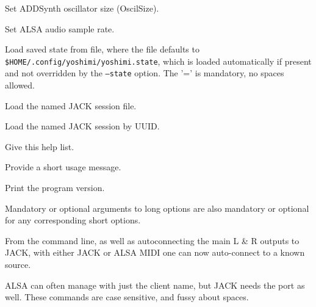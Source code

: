       Set ADDSynth oscillator size (OscilSize).

      Set ALSA audio sample rate.

      Load saved state from file, where the file defaults to
      \texttt{\$HOME/.config/yoshimi/yoshimi.state}, which is loaded
      automatically if present and not overridden by the \texttt{--state}
      option. The '=' is mandatory, no spaces allowed.

      Load the named JACK session file.

      Load the named JACK session by UUID.

      Give this help list.

      Provide a short usage message.

      Print the program version.

   Mandatory or optional arguments to long options are also mandatory or
   optional for any corresponding short options.

   From the command line, as well as autoconnecting the main L \& R outputs
   to JACK, with either JACK or ALSA MIDI one can now auto-connect to a
   known source.

   ALSA can often manage with just the client name, but JACK needs the port
   as well. These commands are case sensitive, and fussy about spaces.

